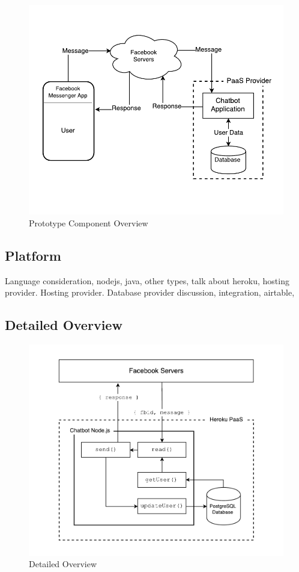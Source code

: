\begin{figure}[H]
    \centering
    \includegraphics[width=5.1in]{../resources/diagrams/chatbot-component-overview.pdf}
    \caption{Prototype Component Overview}
    \label{fig:prototype_component_overview}
\end{figure}

\subsection{Platform}

Language consideration, nodejs, java, other types, talk about heroku, hosting provider. Hosting provider.
Database provider discussion, integration, airtable,

\subsection{Detailed Overview}

\begin{figure}[H]
    \centering
    \includegraphics[width=6in]{../resources/diagrams/chatbot-detailed-overview.pdf}
    \caption{Detailed Overview}
    \label{fig:prototype_detailed_overview}
\end{figure}

